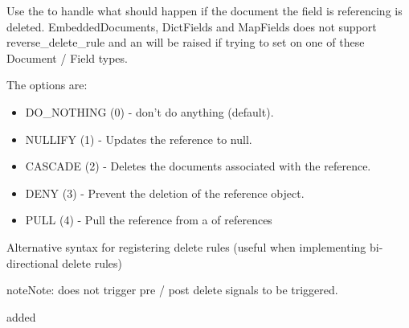 \documentclass[letterpaper,10pt,english]{sphinxmanual}
\begin{document}
\begin{fulllineitems}
\begin{fulllineitems}
Use the  to handle what should happen if the document
the field is referencing is deleted.  EmbeddedDocuments, DictFields and
MapFields does not support reverse\_delete\_rule and an 
will be raised if trying to set on one of these Document / Field types.

The options are:
\begin{itemize}
\item {} 
DO\_NOTHING (0)  - don't do anything (default).

\item {} 
NULLIFY    (1)  - Updates the reference to null.

\item {} 
CASCADE    (2)  - Deletes the documents associated with the reference.

\item {} 
DENY       (3)  - Prevent the deletion of the reference object.

\item {} 
PULL       (4)  - Pull the reference from a  of references

\end{itemize}

Alternative syntax for registering delete rules (useful when implementing
bi-directional delete rules)

\begin{sphinxVerbatim}[commandchars=\\\{\}]
 
      
      

  
\end{sphinxVerbatim}

\begin{sphinxadmonition}{note}{Note:}
 does not trigger pre / post delete signals to be
triggered.
\end{sphinxadmonition}

added 

\end{fulllineitems}


\end{fulllineitems}
\end{document}
